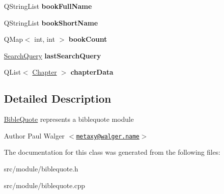 \begin{DoxyCompactItemize}
\item 
\hypertarget{classBibleQuote_af1c9ea90b8f6dbfabe79828d4ca4e715}{
QStringList {\bfseries bookFullName}}
\label{classBibleQuote_af1c9ea90b8f6dbfabe79828d4ca4e715}

\item 
\hypertarget{classBibleQuote_af506ff787daa9c2f5342c5c13618db17}{
QStringList {\bfseries bookShortName}}
\label{classBibleQuote_af506ff787daa9c2f5342c5c13618db17}

\item 
\hypertarget{classBibleQuote_a2febae130e05447c12cd6a7cff32626f}{
QMap$<$ int, int $>$ {\bfseries bookCount}}
\label{classBibleQuote_a2febae130e05447c12cd6a7cff32626f}

\item 
\hypertarget{classBibleQuote_a8ec065ce6fa655d8dd82ba476982980c}{
\hyperlink{classSearchQuery}{SearchQuery} {\bfseries lastSearchQuery}}
\label{classBibleQuote_a8ec065ce6fa655d8dd82ba476982980c}

\item 
\hypertarget{classBibleQuote_a82725939215b4dc61f08f403c79aff61}{
QList$<$ \hyperlink{structChapter}{Chapter} $>$ {\bfseries chapterData}}
\label{classBibleQuote_a82725939215b4dc61f08f403c79aff61}

\end{DoxyCompactItemize}


\subsection{Detailed Description}
\hyperlink{classBibleQuote}{BibleQuote} represents a biblequote module

\begin{DoxyAuthor}{Author}
Paul Walger $<$\href{mailto:metaxy@walger.name}{\tt metaxy@walger.name}$>$ 
\end{DoxyAuthor}


The documentation for this class was generated from the following files:\begin{DoxyCompactItemize}
\item 
src/module/biblequote.h\item 
src/module/biblequote.cpp\end{DoxyCompactItemize}
